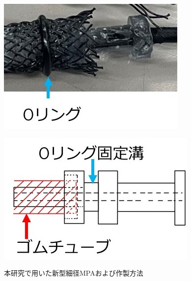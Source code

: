 \begin{figure}[!hb]
  \begin{minipage}{0.49\hsize}
    \centering
    \includegraphics[scale=0.5]{image/MPA_tanbu_2_2.jpg}
    \label{fig:MPA_tanbu_2_1}
  \end{minipage}
  \begin{minipage}{0.49\hsize}
    \centering  
    \includegraphics[scale=0.5]{image/MPA_tanbu_2_1.jpg}
    \label{fig:MPA_tanbu_2_2}
  \end{minipage}
  \caption{本研究で用いた新型細径MPAおよび作製方法}
  \label{fig:MPA_tanbu_2}
\end{figure}
